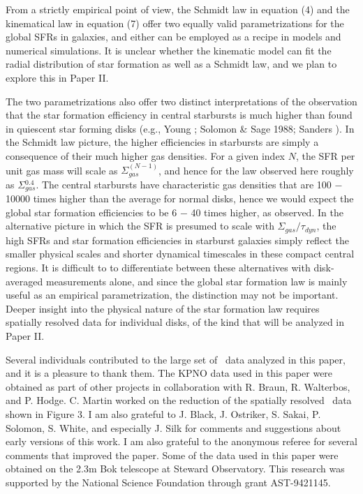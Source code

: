 From a strictly empirical point of view, the Schmidt law in equation (4)
and the kinematical law in equation (7) offer two equally valid 
parametrizations for the global SFRs in galaxies, and either can be
employed as a recipe in models and numerical simulations.  It is
unclear whether the kinematic model can fit the radial distribution
of star formation as well as a Schmidt law, and we plan to explore
this in Paper II.

The two parametrizations also offer two distinct interpretations of 
the observation that the star formation efficiency in
central starbursts is much higher than found in quiescent star forming
disks (e.g., Young ; Solomon \& Sage 1988; Sanders ).  
In the Schmidt law picture, the higher efficiencies in
starbursts are simply a consequence of their much higher gas densities.
For a given index $N$, the SFR per unit gas mass will scale as 
$\Sigma{_{gas}^{(N - 1)}}$, and hence for the law observed here 
roughly as $\Sigma{_{gas}^{0.4}}$.  The
central starbursts have characteristic gas densities that are 
100 $-$ 10000 times higher than the average for normal disks, hence we 
would expect the global star formation efficiencies to be 6 $-$ 40 times
higher, as observed. 
In the alternative picture in which the SFR is presumed to scale with 
$\Sigma_{gas} / \tau_{dyn}$, the high SFRs and star formation efficiencies
in starburst galaxies simply 
reflect the smaller physical scales and shorter dynamical timescales
in these compact central regions.  It is difficult to 
to differentiate between these alternatives with disk-averaged measurements
alone, and since the global star formation law is mainly
useful as an empirical parametrization, the distinction may not be important.
Deeper insight into the physical nature of the star formation law requires
spatially resolved data for individual disks, of the kind that will
be analyzed in Paper II.

\acknowledgments
Several individuals contributed to the large set of \halpha\ data 
analyzed in this paper, and it is a pleasure to thank them.  The KPNO
data used in this paper were obtained as part of other projects in 
collaboration with R. Braun, R. Walterbos, and P. Hodge.  C. Martin
worked on the reduction of the spatially resolved \halpha\ data
shown in Figure 3.  I am also grateful to 
J. Black, J. Ostriker, S. Sakai, P. Solomon, S. White, and especially J. Silk 
for comments and suggestions about early versions of this work.  I am
also grateful to the anonymous referee for several comments that
improved the paper.
Some of the data used in this paper were obtained on the 2.3m Bok
telescope at Steward Observatory.  
This research was supported by the National Science Foundation
through grant AST-9421145.


